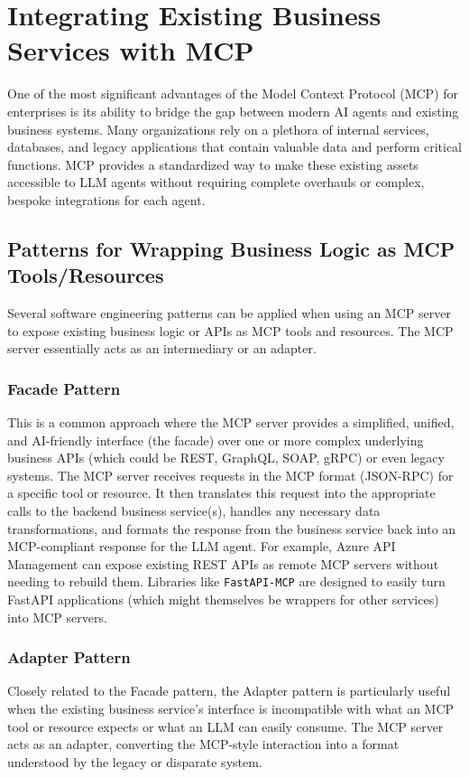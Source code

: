 \chapter{Integrating Existing Business Services with MCP}

One of the most significant advantages of the Model Context Protocol (MCP) for enterprises is its ability to bridge the gap between modern 
AI agents and existing business systems. Many organizations rely on a plethora of internal services, databases, and legacy applications that 
contain valuable data and perform critical functions. MCP provides a standardized way to make these existing assets accessible to LLM agents
 without requiring complete overhauls or complex, bespoke integrations for each agent.

\section{Patterns for Wrapping Business Logic as MCP Tools/Resources}

Several software engineering patterns can be applied when using an MCP server to expose existing business logic or APIs as MCP tools and resources.
 The MCP server essentially acts as an intermediary or an adapter.

\subsection*{Facade Pattern}
This is a common approach where the MCP server provides a simplified, unified, and AI-friendly interface (the facade) over one or more 
complex underlying business APIs (which could be REST, GraphQL, SOAP, gRPC) or even legacy systems. The MCP server receives requests
 in the MCP format (JSON-RPC) for a specific tool or resource. It then translates this request into the appropriate calls to the backend business service(s), 
 handles any necessary data transformations, and formats the response from the business service back into an MCP-compliant response for the LLM agent. 
 For example, Azure API Management can expose existing REST APIs as remote MCP servers without needing to rebuild them. Libraries like \texttt{FastAPI-MCP} 
 are designed to easily turn FastAPI applications (which might themselves be wrappers for other services) into MCP servers.

\subsection*{Adapter Pattern}
Closely related to the Facade pattern, the Adapter pattern is particularly useful when the existing business service's interface is incompatible
 with what an MCP tool or resource expects or what an LLM can easily consume. The MCP server acts as an adapter, converting the MCP-style interaction 
 into a format understood by the legacy or disparate system.

